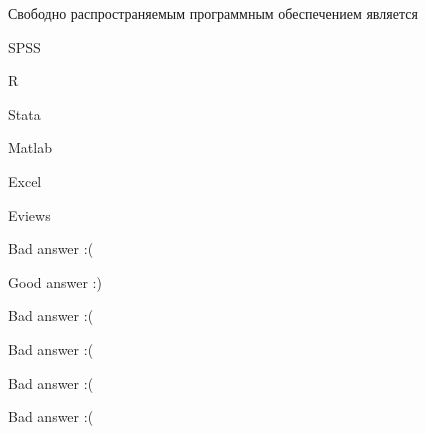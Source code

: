 
\begin{question}
Свободно распространяемым программным обеспечением является
\begin{answerlist}
  \item SPSS
  \item R
  \item Stata
  \item Matlab
  \item Excel
  \item Eviews
\end{answerlist}
\end{question}

\begin{solution}
\begin{answerlist}
  \item Bad answer :(
  \item Good answer :)
  \item Bad answer :(
  \item Bad answer :(
  \item Bad answer :(
  \item Bad answer :(
\end{answerlist}
\end{solution}

